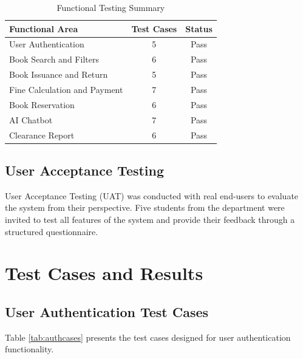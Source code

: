 \documentclass[12pt,a4paper]{report}
\begin{document}
\vspace{0.3cm}

\begin{table}[h]
\centering
\begin{tabular}{|p{5.5cm}|c|c|}
\hline
\textbf{Functional Area} & \textbf{Test Cases} & \textbf{Status} \\
\hline
User Authentication & 5 & Pass \\
\hline
Book Search and Filters & 6 & Pass \\
\hline
Book Issuance and Return & 5 & Pass \\
\hline
Fine Calculation and Payment & 7 & Pass \\
\hline
Book Reservation & 6 & Pass \\
\hline
AI Chatbot & 7 & Pass \\
\hline
Clearance Report & 6 & Pass \\
\hline
\end{tabular}
\caption{Functional Testing Summary}
\label{tab:functionaltests}
\end{table}

\subsection{User Acceptance Testing}

User Acceptance Testing (UAT) was conducted with real end-users to evaluate the system from their perspective. Five students from the department were invited to test all features of the system and provide their feedback through a structured questionnaire.

\section{Test Cases and Results}

\subsection{User Authentication Test Cases}

Table \ref{tab:authcases} presents the test cases designed for user authentication functionality.

\vspace{0.5cm}
\end{document}
